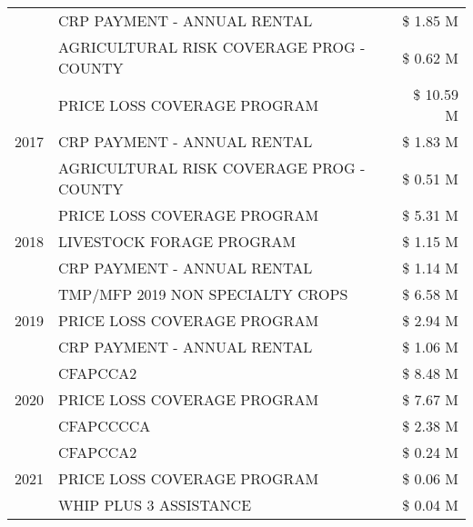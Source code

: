 \begin{tabular}{llr}
 & CRP PAYMENT - ANNUAL RENTAL & \$ 1.85 M \\
 & AGRICULTURAL RISK COVERAGE PROG - COUNTY & \$ 0.62 M \\
\cline{1-3}
\multirow[t]{3}{*}{2017} & PRICE LOSS COVERAGE PROGRAM & \$ 10.59 M \\
 & CRP PAYMENT - ANNUAL RENTAL & \$ 1.83 M \\
 & AGRICULTURAL RISK COVERAGE PROG - COUNTY & \$ 0.51 M \\
\cline{1-3}
\multirow[t]{3}{*}{2018} & PRICE LOSS COVERAGE PROGRAM & \$ 5.31 M \\
 & LIVESTOCK FORAGE PROGRAM & \$ 1.15 M \\
 & CRP PAYMENT - ANNUAL RENTAL & \$ 1.14 M \\
\cline{1-3}
\multirow[t]{3}{*}{2019} & TMP/MFP 2019 NON SPECIALTY CROPS & \$ 6.58 M \\
 & PRICE LOSS COVERAGE PROGRAM & \$ 2.94 M \\
 & CRP PAYMENT - ANNUAL RENTAL & \$ 1.06 M \\
\cline{1-3}
\multirow[t]{3}{*}{2020} & CFAPCCA2 & \$ 8.48 M \\
 & PRICE LOSS COVERAGE PROGRAM & \$ 7.67 M \\
 & CFAPCCCCA & \$ 2.38 M \\
\cline{1-3}
\multirow[t]{3}{*}{2021} & CFAPCCA2 & \$ 0.24 M \\
 & PRICE LOSS COVERAGE PROGRAM & \$ 0.06 M \\
 & WHIP PLUS 3 ASSISTANCE & \$ 0.04 M \\
\cline{1-3}
\bottomrule
\end{tabular}
